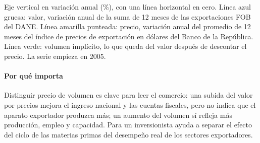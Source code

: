 \begin{leer}
Eje vertical en variación anual (\%), con una línea horizontal en cero. Línea azul gruesa: valor, variación anual de la suma de 12 meses de las exportaciones FOB del DANE. Línea amarilla punteada: precio, variación anual del promedio de 12 meses del índice de precios de exportación en dólares del Banco de la República. Línea verde: volumen implícito, lo que queda del valor después de descontar el precio. La serie empieza en 2005.
\end{leer}

\paragraph{Por qué importa}
Distinguir precio de volumen es clave para leer el comercio: una subida del valor por precios mejora el ingreso nacional y las cuentas fiscales, pero no indica que el aparato exportador produzca más; un aumento del volumen sí refleja más producción, empleo y capacidad. Para un inversionista ayuda a separar el efecto del ciclo de las materias primas del desempeño real de los sectores exportadores.

